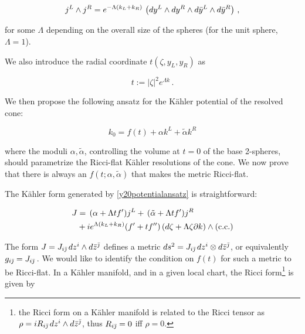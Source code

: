 \begin{equation}\label{spheresareEinstein}
	j^L \wedge j^R = e^{-\Lambda(k_L + k_R)}\, \left(dy^L \wedge dy^R \wedge d\bar y^L \wedge d\bar y^R\right)\,,
\end{equation}

for some $\Lambda$ depending on the overall size of the spheres (for the unit sphere, $\Lambda = 1$).

We also introduce the radial coordinate $t(\zeta,y_L,y_R)$ as 

\begin{equation}
	t := |\zeta|^2 e^{\Lambda k}\,.
\end{equation}

We then propose the following ansatz for the K\"ahler potential of the resolved cone:

\begin{equation}
	k_0 = f(t) + \alpha k^L + \tilde\alpha k^R \label{y20potentialansatz}
\end{equation}

where the moduli $\alpha,\tilde\alpha$, controlling the volume at $t=0$ of the base 2-spheres, should parametrize the Ricci-flat K\"ahler resolutions of the cone. We now prove that there is always an $f(t;\alpha,\tilde\alpha)$ that makes the metric Ricci-flat.

The K\"ahler form generated by \eqref{y20potentialansatz} is straightforward:

\begin{align}
	\begin{split}\label{y20kahlerformansatz}
	J &= \, (\alpha + \Lambda t f') j^L + \, (\tilde\alpha + \Lambda t f') j^R \\&+ i e^{\Lambda(k_L + k_R)} (f' + t f'') \, (d\zeta + \Lambda \zeta \partial k) \wedge (\mathrm{c.c.})
\end{split}
\end{align}

\newcommand{\fibral}{e^3 \wedge \bar e^{\bar 3}}




The form $J = J_{i\bar{\jmath}}\, dz^i \wedge d\bar z^{\bar\jmath}$ defines a metric $ds^2 = J_{i\bar{\jmath}}\, dz^i \otimes d\bar z^{\bar\jmath}$, or equivalently $g_{i\bar{\jmath}} = J_{i\bar{\jmath}}\,$. We would like to identify the condition on $f(t)$ for such a metric to be Ricci-flat. In a K\"ahler manifold, and in a given local chart, the Ricci form\footnote{the Ricci form on a K\"ahler manifold is related to the Ricci tensor as $\rho = i R_{i\bar{\jmath}} \, dz^i \wedge d\bar z^{\bar\jmath}$, thus $R_{i\bar{\jmath}} = 0$ iff $\rho = 0$. } is given by \cite{Ballmann}

